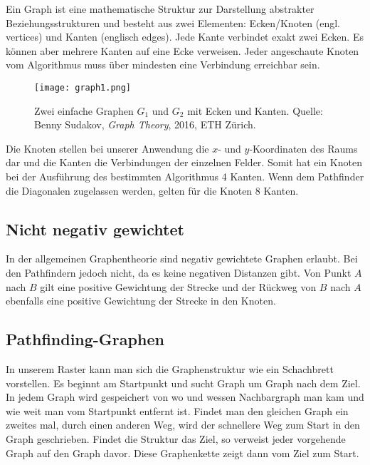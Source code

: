 Ein Graph ist eine mathematische Struktur zur Darstellung abstrakter
Beziehungsstrukturen und besteht aus zwei Elementen: Ecken/Knoten (engl.
vertices) und Kanten (englisch edges). Jede Kante verbindet exakt zwei
Ecken. Es können aber mehrere Kanten auf eine Ecke verweisen. Jeder
angeschaute Knoten vom Algorithmus muss über mindesten eine Verbindung
erreichbar sein.

\begin{figure}[H]
  \centering
  \texttt{[image: graph1.png]}
  \caption[Zwei einfache Graphen $G_1$ und $G_2$ mit Ecken und Kanten. Quelle: Benny Sudakov, \textit{Graph Theory}, 2016, ETH Zürich.]{Zwei einfache Graphen $G_1$ und $G_2$ mit Ecken und Kanten. Quelle: Benny Sudakov, \textit{Graph Theory}, 2016, ETH Zürich.}
  \label{fig:graph1}
\end{figure}

Die Knoten stellen bei unserer Anwendung die $x$- und $y$-Koordinaten des Raums
dar und die Kanten die Verbindungen der einzelnen Felder. Somit hat ein
Knoten bei der Ausführung des bestimmten Algorithmus 4 Kanten. Wenn dem
Pathfinder die Diagonalen zugelassen werden, gelten für die Knoten 8
Kanten.
\cite[Franz Embacher, 2003]{uniwiengraphen}

\subsection{Nicht negativ gewichtet}
\label{chap:nicht-negativ-gewichtet}

In der allgemeinen Graphentheorie sind negativ gewichtete Graphen
erlaubt. Bei den Pathfindern jedoch nicht, da es keine negativen
Distanzen gibt. Von Punkt $A$ nach $B$ gilt eine positive Gewichtung der
Strecke und der Rückweg von $B$ nach $A$ ebenfalls eine positive Gewichtung
der Strecke in den Knoten.
\cite[Krumke; Noltemeier; Schwarz; Wirth, 2000, S. 76]{graphtheoryconcepts}

\subsection{Pathfinding-Graphen}

In unserem Raster kann man sich die Graphenstruktur wie ein Schachbrett
vorstellen. Es beginnt am Startpunkt und sucht Graph um Graph nach dem Ziel.
In jedem Graph wird gespeichert von wo und wessen Nachbargraph man kam und
wie weit man vom Startpunkt entfernt ist. Findet man den gleichen Graph
ein zweites mal, durch einen anderen Weg, wird der schnellere Weg zum
Start in den Graph geschrieben. Findet die Struktur das Ziel, so
verweist jeder vorgehende Graph auf den Graph davor. Diese Graphenkette zeigt dann vom Ziel zum Start.
\cite[Vinther, Vinther, 2015, S. 22]{pftwodim}

